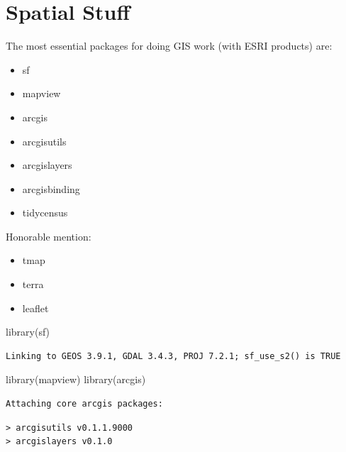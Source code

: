 \documentclass[
  letterpaper,
  DIV=11,
  numbers=noendperiod]{scrreprt}
\newenvironment{Shaded}{\begin{snugshade}}{\end{snugshade}}
\newcommand{\FunctionTok}[1]{\textcolor[rgb]{0.28,0.35,0.67}{#1}}
\newcommand{\NormalTok}[1]{\textcolor[rgb]{0.00,0.23,0.31}{#1}}
\providecommand{\tightlist}{%
  \setlength{\itemsep}{0pt}\setlength{\parskip}{0pt}}\usepackage{longtable,booktabs,array}
\begin{document}

\chapter{Spatial Stuff}\label{spatial-stuff}

The most essential packages for doing GIS work (with ESRI products) are:

\begin{itemize}
\tightlist
\item
  sf
\item
  mapview
\item
  arcgis
\item
  arcgisutils
\item
  arcgislayers
\item
  arcgisbinding
\item
  tidycensus
\end{itemize}

Honorable mention:

\begin{itemize}
\tightlist
\item
  tmap
\item
  terra
\item
  leaflet
\end{itemize}

\begin{Shaded}
\begin{Highlighting}[]
\FunctionTok{library}\NormalTok{(sf)}
\end{Highlighting}
\end{Shaded}

\begin{verbatim}
Linking to GEOS 3.9.1, GDAL 3.4.3, PROJ 7.2.1; sf_use_s2() is TRUE
\end{verbatim}

\begin{Shaded}
\begin{Highlighting}[]
\FunctionTok{library}\NormalTok{(mapview)}
\FunctionTok{library}\NormalTok{(arcgis)}
\end{Highlighting}
\end{Shaded}

\begin{verbatim}
Attaching core arcgis packages:
\end{verbatim}

\begin{verbatim}
> arcgisutils v0.1.1.9000
> arcgislayers v0.1.0
\end{verbatim}
\end{document}
